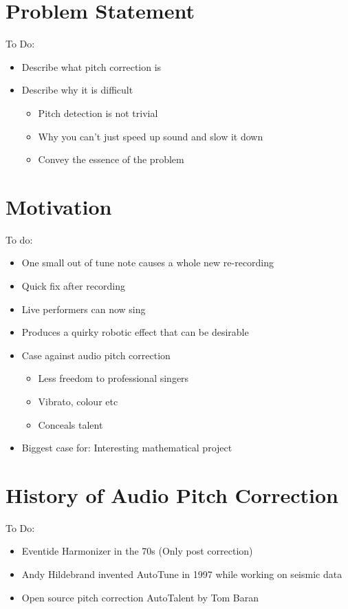 
\section{Problem Statement}

\color{red}
To Do:
\begin{itemize}
	\item Describe what pitch correction is
	\item Describe why it is difficult
	\begin{itemize}
		\item Pitch detection is not trivial
		\item Why you can't just speed up sound and slow it down
		\item Convey the essence of the problem
	\end{itemize}
\end{itemize}
\color{black}

\section{Motivation}

\color{red}
To do:
\begin{itemize}
	\item One small out of tune note causes a whole new re-recording
	\item Quick fix after recording
	\item Live performers can now sing
	\item Produces a quirky robotic effect that can be desirable
	\item Case against audio pitch correction
	\begin{itemize}
		\item Less freedom to professional singers
		\item Vibrato, colour etc
		\item Conceals talent
	\end{itemize}
	\item Biggest case for: Interesting mathematical project
\end{itemize}
\color{black}

\section{History of Audio Pitch Correction}

\color{red}
To Do:
\begin{itemize}
	\item Eventide Harmonizer in the 70s (Only post correction)
	\item Andy Hildebrand invented AutoTune in 1997 while working on seismic data
	\item Open source pitch correction AutoTalent by Tom Baran
\end{itemize}
\color{black}

